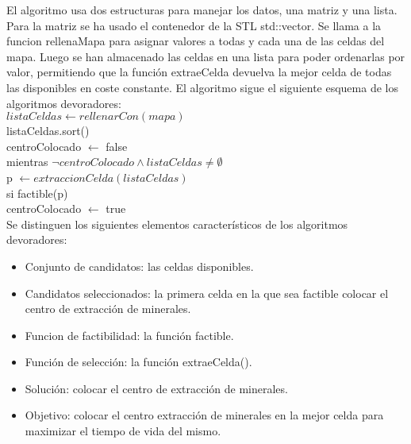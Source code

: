 El algoritmo usa dos estructuras para manejar los datos, una matriz y una lista. Para la matriz se ha usado
el contenedor de la STL std::vector. Se llama a la funcion rellenaMapa para asignar valores a todas y cada una
de las celdas del mapa. Luego se han almacenado las celdas en una lista para poder ordenarlas por valor,
permitiendo que la funci\'on extraeCelda devuelva la mejor celda de todas las disponibles en coste constante.
El algoritmo sigue el siguiente esquema de los algoritmos devoradores:\\
$ listaCeldas \leftarrow rellenarCon(mapa) $ \\
listaCeldas.sort()\\
centroColocado $\leftarrow$ false \\
mientras $ \neg  centroColocado  \land listaCeldas  \neq \emptyset $\\
\hspace*{1cm} p $\leftarrow extraccionCelda(listaCeldas)$\\
\hspace*{1cm} si factible(p)\\
\hspace*{2cm} centroColocado  $\leftarrow$ true\\

Se distinguen los siguientes elementos caracter\'isticos de los algoritmos devoradores:
\begin{itemize}
    \item Conjunto de candidatos: las celdas disponibles.   
    \item Candidatos seleccionados: la primera celda en la que sea factible colocar el centro de extracción de minerales.
    \item Funcion de factibilidad: la funci\'on factible.
    \item Funci\'on de selecci\'on: la funci\'on extraeCelda().
    \item Soluci\'on: colocar el centro de extracci\'on de minerales.
    \item Objetivo: colocar el centro extracci\'on de minerales en la mejor celda para maximizar el tiempo de vida del mismo.
\end{itemize}
